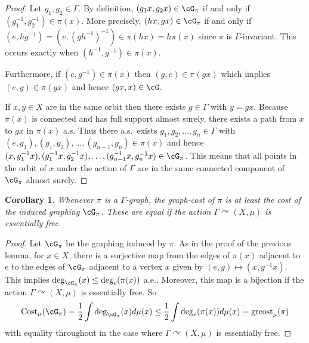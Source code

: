 \documentclass[12pt]{article}
\theoremstyle{plain}
\newtheorem{cor}[thm]{Corollary}
\theoremstyle{definition}
\theoremstyle{remark}
\newcommand{\G}{\Gamma}
\newcommand\cost{{\operatorname{Cost}}}
\def\cc{{\curvearrowright}}
\begin{document}
\begin{proof}
    Let $g_1, g_2 \in \G$. By definition, $(g_1 x,g_2 x) \in \cG_\pi$ if and only if $(g_1^{-1},g_2^{-1})\in \pi(x)$. More precisely,
    $(hx,gx) \in \cG_\pi$ if and only if $(e,hg^{-1})=(e,(gh^{-1})^{-1}) \in \pi(hx)=h\pi(x)$ since $\pi$ is $\G$-invariant. This occurs exactly when $(h^{-1},g^{-1}) \in \pi(x)$.
    
    Furthermore, if $(e,g^{-1}) \in \pi(x)$ then $(g,e) \in \pi(g x)$ which implies $(e,g) \in \pi(g x)$ and hence $(g x,x)\in \cG$.

    If $x,y\in X$ are in the same orbit then there exists $g \in \G$ with $y=g x$. Because $\pi(x)$ is connected and has full support almost surely, there exists a path from $x$ to $g x$ in $\pi(x)$ a.s.
    Thus there a.s.~exists $g_1,g_2,\ldots, g_n \in \G$ with $(e,g_1), (g_1,g_2),\ldots, (g_{n-1},g_n) \in \pi(x)$ and hence $(x, g_1^{-1}x), (g_1^{-1}x, g_2^{-1}x), 
    \ldots, (g_{n-1}^{-1}x, g_{n}^{-1}x) \in \cG_\pi$. This means that all points in the orbit of $x$ under the action of $\G$ are in the same connected component of $\cG_\pi$ almost surely.
\end{proof}

\begin{cor}
    Whenever $\pi$ is a $\G$-graph, the graph-cost of $\pi$ is at least the cost of the induced graphing $\cG_\pi$. These are equal if the action $\G \cc (X,\mu)$ is essentially free.
\end{cor}

\begin{proof}
    Let $\cG_\pi$ be the graphing induced by $\pi$.  As in the proof of the previous lemma, for $x\in X$, there is a surjective map from the edges of $\pi(x)$ adjacent to $e$ to the edges of $\cG_\pi$ adjacent to a vertex $x$ given by $(e,g)\mapsto (x,g^{-1}x)$. This implies  $\deg_{\cG_\pi}(x) \le \deg_e(\pi(x))$ a.e.. Moreover, this map is a bijection if the action $\G \cc (X,\mu)$ is essentially free. So  
    \[\cost_\mu(\cG_\pi) = \frac{1}{2} \int \deg_{\cG_\pi}(x) d \mu(x) \le \frac{1}{2} \int \deg_e(\pi(x)) d\mu(x) = \operatorname{grcost}_\mu(\pi) \]
 with equality throughout in the case where $\G\cc(X,\mu)$ is essentially free.  
\end{proof}
\end{document}
